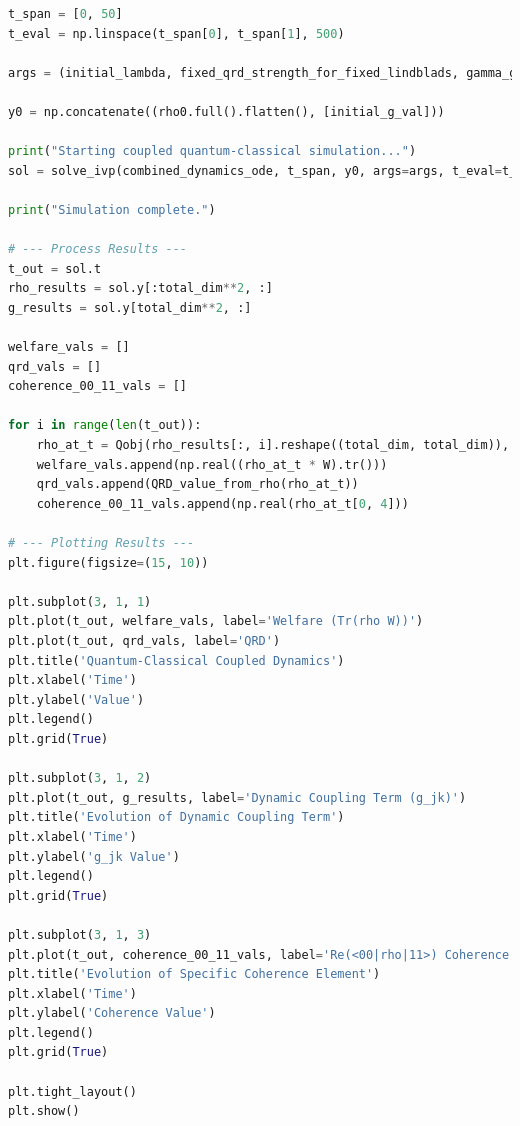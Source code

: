 \documentclass[9pt]{article}
\begin{document}
\begin{lstlisting}[language=Python, basicstyle=\ttfamily\footnotesize, breaklines=true, frame=single, caption={Python Code for Emergence of Endogenous Dynamics}, label={lst:qrd_code}]
t_span = [0, 50]
t_eval = np.linspace(t_span[0], t_span[1], 500)

args = (initial_lambda, fixed_qrd_strength_for_fixed_lindblads, gamma_g, kappa_g, D_hat_example)

y0 = np.concatenate((rho0.full().flatten(), [initial_g_val]))

print("Starting coupled quantum-classical simulation...")
sol = solve_ivp(combined_dynamics_ode, t_span, y0, args=args, t_eval=t_eval, method='RK45', rtol=1e-6, atol=1e-8)

print("Simulation complete.")

# --- Process Results ---
t_out = sol.t
rho_results = sol.y[:total_dim**2, :]
g_results = sol.y[total_dim**2, :]

welfare_vals = []
qrd_vals = []
coherence_00_11_vals = []

for i in range(len(t_out)):
    rho_at_t = Qobj(rho_results[:, i].reshape((total_dim, total_dim)), dims=[Ns, Ns])
    welfare_vals.append(np.real((rho_at_t * W).tr()))
    qrd_vals.append(QRD_value_from_rho(rho_at_t))
    coherence_00_11_vals.append(np.real(rho_at_t[0, 4]))

# --- Plotting Results ---
plt.figure(figsize=(15, 10))

plt.subplot(3, 1, 1)
plt.plot(t_out, welfare_vals, label='Welfare (Tr(rho W))')
plt.plot(t_out, qrd_vals, label='QRD')
plt.title('Quantum-Classical Coupled Dynamics')
plt.xlabel('Time')
plt.ylabel('Value')
plt.legend()
plt.grid(True)

plt.subplot(3, 1, 2)
plt.plot(t_out, g_results, label='Dynamic Coupling Term (g_jk)')
plt.title('Evolution of Dynamic Coupling Term')
plt.xlabel('Time')
plt.ylabel('g_jk Value')
plt.legend()
plt.grid(True)

plt.subplot(3, 1, 3)
plt.plot(t_out, coherence_00_11_vals, label='Re(<00|rho|11>) Coherence')
plt.title('Evolution of Specific Coherence Element')
plt.xlabel('Time')
plt.ylabel('Coherence Value')
plt.legend()
plt.grid(True)

plt.tight_layout()
plt.show()
\end{lstlisting}
\end{document}

